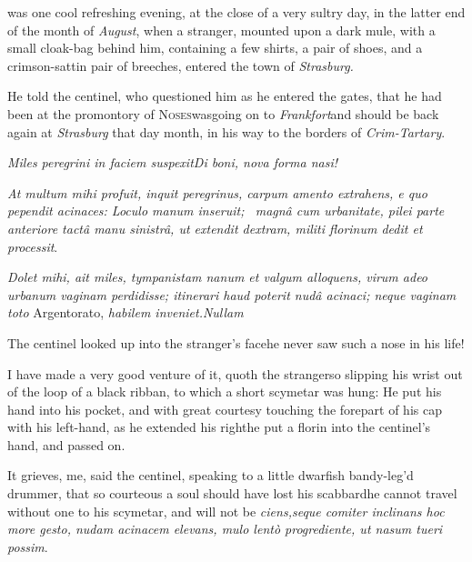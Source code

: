 \documentclass{article}
\begin{document}
 was one cool refreshing evening,
at the close of a very sultry day, in the latter end of the month
of \textit{August}, when a stranger, mounted upon a dark mule, with a
small cloak-bag behind him, containing a few shirts, a pair of
shoes, and a crimson-sattin pair of breeches, entered the town of
\textit{Strasburg.}

He told the centinel, who questioned him as he entered the
gates, that he had been at the promontory of
\textsc{Noses}\tsk was\break going on to
\textit{Frankfort}\tsh and should be back again at
\textit{Strasburg} that day month, in his way to the borders of
\textit{Crim-\break Tartary}.

\pagestyle{fancy}
\textit{Miles peregrini in faciem suspexit\tsh Di boni, nova
forma nasi!}

\baselineskip

\textit{At multum mihi profuit, inquit peregrinus, carpum amento
extrahens, e quo pependit acinaces: Loculo manum inse\-ruit; \et\ magnâ cum
urbanitate, pilei parte anteriore tactâ manu sinistrâ,
ut extendit dextram, militi florinum dedit et processit}.

\baselineskip

\textit{Dolet mihi, ait miles, tympanistam na\-num et valgum alloquens,
virum adeo urbanum vaginam perdidisse; itinerari haud poterit
nudâ acinaci; neque vaginam toto} Argentorato, \textit{habilem
inveniet.\tsh Nullam 
}

The centinel looked up into the stran\-ger’s
face\tsh he never saw such a nose in his life!


\tsk I have made a very good venture of it, quoth the
stranger\tsk so slipping his wrist out of the loop of a black
ribban, to which a short scymetar was hung: He put his hand
into his pocket, and with great courtesy touching the forepart of
his cap with his left-hand, as he extended his
right\tsk he put a florin into the centinel’s hand,
and passed on.

It grieves, me, said the centinel, speaking to a little dwarfish
bandy-leg’d drummer, that so courteous a soul should have
lost his scabbard\tsk he cannot travel without one to his
scymetar, and will not be\break
{}
\textit{ciens,\tsk seque comiter inclinans \tsk hoc more
gesto, nudam acinacem elevans, mulo lentò progrediente, ut
nasum tueri possim}.
\end{document}
